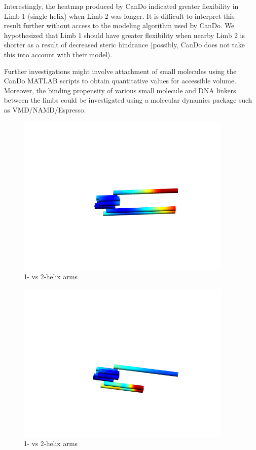 \documentclass{article}
\begin{document}
Interestingly, the heatmap produced by CanDo indicated greater flexibility in Limb 1 (single helix) when Limb 2 was longer. It is difficult to interpret this result further without access to the modeling algorithm used by CanDo. We hypothesized that Limb 1 should have greater flexibility when nearby Limb 2 is shorter as a result of decreased steric hindrance (possibly, CanDo does not take this into account with their model).

Further investigations might involve attachment of small molecules using the CanDo MATLAB scripts to obtain quantitative values for accessible volume. Moreover, the binding propensity of various small molecule and DNA linkers between the limbs could be investigated using a molecular dynamics package such as VMD/NAMD/Espresso.



\begin{figure}
\includegraphics[width=300pt]{long_heat}
\caption{1- vs 2-helix arms}
  \label{fig:long_heat}
\end{figure}

\begin{figure}
\includegraphics[width=300pt]{short_heat}
\caption{1- vs 2-helix arms}
  \label{fig:short_heat}
\end{figure}
\end{document}
